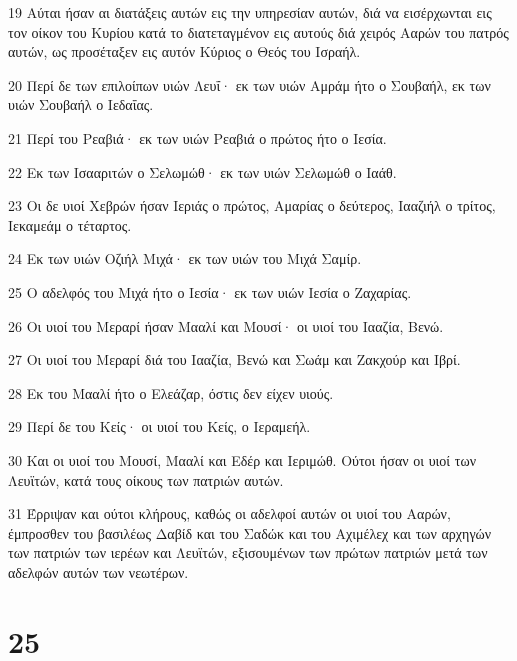 \par 19 Αύται ήσαν αι διατάξεις αυτών εις την υπηρεσίαν αυτών, διά να εισέρχωνται εις τον οίκον του Κυρίου κατά το διατεταγμένον εις αυτούς διά χειρός Ααρών του πατρός αυτών, ως προσέταξεν εις αυτόν Κύριος ο Θεός του Ισραήλ.
\par 20 Περί δε των επιλοίπων υιών Λευΐ· εκ των υιών Αμράμ ήτο ο Σουβαήλ, εκ των υιών Σουβαήλ ο Ιεδαΐας.
\par 21 Περί του Ρεαβιά· εκ των υιών Ρεαβιά ο πρώτος ήτο ο Ιεσία.
\par 22 Εκ των Ισααριτών ο Σελωμώθ· εκ των υιών Σελωμώθ ο Ιαάθ.
\par 23 Οι δε υιοί Χεβρών ήσαν Ιεριάς ο πρώτος, Αμαρίας ο δεύτερος, Ιααζιήλ ο τρίτος, Ιεκαμεάμ ο τέταρτος.
\par 24 Εκ των υιών Οζιήλ Μιχά· εκ των υιών του Μιχά Σαμίρ.
\par 25 Ο αδελφός του Μιχά ήτο ο Ιεσία· εκ των υιών Ιεσία ο Ζαχαρίας.
\par 26 Οι υιοί του Μεραρί ήσαν Μααλί και Μουσί· οι υιοί του Ιααζία, Βενώ.
\par 27 Οι υιοί του Μεραρί διά του Ιααζία, Βενώ και Σωάμ και Ζακχούρ και Ιβρί.
\par 28 Εκ του Μααλί ήτο ο Ελεάζαρ, όστις δεν είχεν υιούς.
\par 29 Περί δε του Κείς· οι υιοί του Κείς, ο Ιεραμεήλ.
\par 30 Και οι υιοί του Μουσί, Μααλί και Εδέρ και Ιεριμώθ. Ούτοι ήσαν οι υιοί των Λευϊτών, κατά τους οίκους των πατριών αυτών.
\par 31 Έρριψαν και ούτοι κλήρους, καθώς οι αδελφοί αυτών οι υιοί του Ααρών, έμπροσθεν του βασιλέως Δαβίδ και του Σαδώκ και του Αχιμέλεχ και των αρχηγών των πατριών των ιερέων και Λευϊτών, εξισουμένων των πρώτων πατριών μετά των αδελφών αυτών των νεωτέρων.

\chapter{25}


